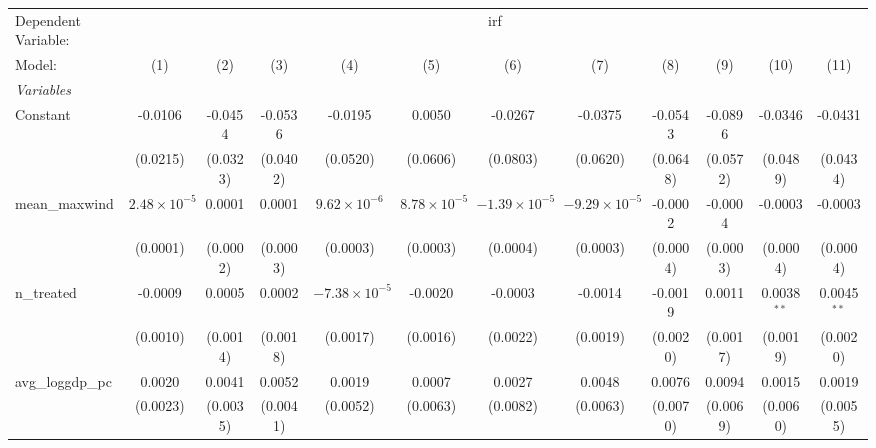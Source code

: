 
\begingroup
\centering
\begin{tabular}{lccccccccccc}
   \tabularnewline \midrule \midrule
   Dependent Variable: & \multicolumn{11}{c}{irf}\\
   Model:            & (1)                   & (2)      & (3)      & (4)                    & (5)                   & (6)                    & (7)                    & (8)      & (9)      & (10)          & (11)\\  
   \midrule
   \emph{Variables}\\
   Constant          & -0.0106               & -0.0454  & -0.0536  & -0.0195                & 0.0050                & -0.0267                & -0.0375                & -0.0543  & -0.0896  & -0.0346       & -0.0431\\   
                     & (0.0215)              & (0.0323) & (0.0402) & (0.0520)               & (0.0606)              & (0.0803)               & (0.0620)               & (0.0648) & (0.0572) & (0.0489)      & (0.0434)\\   
   mean\_maxwind     & $2.48\times 10^{-5}$  & 0.0001   & 0.0001   & $9.62\times 10^{-6}$   & $8.78\times 10^{-5}$  & $-1.39\times 10^{-5}$  & $-9.29\times 10^{-5}$  & -0.0002  & -0.0004  & -0.0003       & -0.0003\\   
                     & (0.0001)              & (0.0002) & (0.0003) & (0.0003)               & (0.0003)              & (0.0004)               & (0.0003)               & (0.0004) & (0.0003) & (0.0004)      & (0.0004)\\   
   n\_treated        & -0.0009               & 0.0005   & 0.0002   & $-7.38\times 10^{-5}$  & -0.0020               & -0.0003                & -0.0014                & -0.0019  & 0.0011   & 0.0038$^{**}$ & 0.0045$^{**}$\\   
                     & (0.0010)              & (0.0014) & (0.0018) & (0.0017)               & (0.0016)              & (0.0022)               & (0.0019)               & (0.0020) & (0.0017) & (0.0019)      & (0.0020)\\   
   avg\_loggdp\_pc   & 0.0020                & 0.0041   & 0.0052   & 0.0019                 & 0.0007                & 0.0027                 & 0.0048                 & 0.0076   & 0.0094   & 0.0015        & 0.0019\\   
                     & (0.0023)              & (0.0035) & (0.0041) & (0.0052)               & (0.0063)              & (0.0082)               & (0.0063)               & (0.0070) & (0.0069) & (0.0060)      & (0.0055)\\   

\end{tabular}
